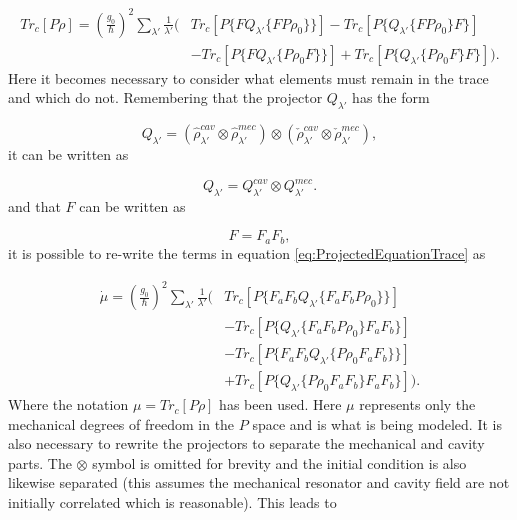 \documentclass[12pt]{article}
\begin{document}
\begin{align}\label{eq:ProjectedEquationTrace}
   Tr_c[P\dot{\rho}] = (\frac{g_0 }{\hbar})^2 \sum_{\lambda'}\frac{1}{\lambda'}\Bigg(& Tr_c[P\{FQ_{\lambda'}\{FP\rho_0\}\}]-Tr_c[P\{Q_{\lambda'}\{FP\rho_0\}F\}]\nonumber\\
    &-Tr_c[P\{FQ_{\lambda'}\{P\rho_0F \} \}] +Tr_c[P\{Q_{\lambda'}\{P\rho_0F \}F\}] \Bigg).
\end{align} Here it becomes necessary to consider what elements must remain in the trace and which do not. Remembering that the projector $Q_{\lambda'}$ has the form

\begin{equation}
    Q_{\lambda'} =  (\hat{\rho}_{\lambda'}^{cav}\otimes \hat{\rho}_{\lambda'}^{mec})\otimes(\check{\rho}_{\lambda'}^{cav}\otimes\check{\rho}_{\lambda'}^{mec}),
\end{equation} it can be written as

\begin{equation}
    Q_{\lambda'} = Q_{\lambda'}^{cav}\otimes Q_{\lambda'}^{mec}.
\end{equation} and that $F$ can be written as

\begin{equation}
    F = F_a F_b,
\end{equation} it is possible to re-write the terms in equation \eqref{eq:ProjectedEquationTrace} as

\begin{align*}
    \dot{\mu} = (\frac{g_0 }{\hbar})^2 \sum_{\lambda'}\frac{1}{\lambda'}\Bigg(& Tr_c[P\{F_a F_bQ_{\lambda'}\{F_a F_bP\rho_0\}\}]\\
    &-Tr_c[P\{Q_{\lambda'}\{F_a F_bP\rho_0\}F_a F_b\}]\\
    &-Tr_c[P\{F_a F_bQ_{\lambda'}\{P\rho_0F_a F_b \} \}]\\ &+Tr_c[P\{Q_{\lambda'}\{P\rho_0 F_a F_b\}F_a F_b\}] \Bigg).
\end{align*} Where the notation $\mu=Tr_c[P\rho]$ has been used. Here $\mu$ represents only the mechanical degrees of freedom in the $P$ space and is what is being modeled. It is also necessary to rewrite the projectors to separate the mechanical and cavity parts. The $\otimes$ symbol is omitted for brevity and the initial condition is also likewise separated (this assumes the mechanical resonator and cavity field are not initially correlated which is reasonable). This leads to
\end{document}
